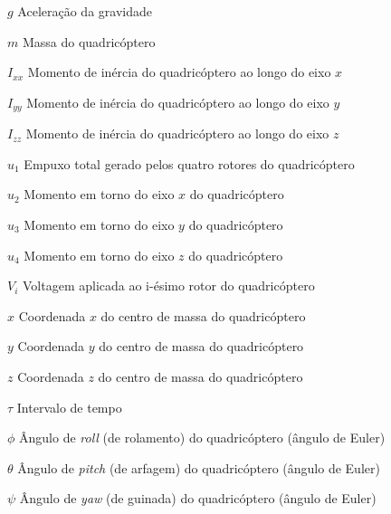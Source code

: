 %
%

\begin{simbolos}
	\item[$ g $] Aceleração da gravidade
	\item[$ m $] Massa do quadricóptero
	\item[$ I_{xx} $] Momento de inércia do quadricóptero ao longo do eixo $x$
	\item[$ I_{yy} $] Momento de inércia do quadricóptero ao longo do eixo $y$
	\item[$ I_{zz} $] Momento de inércia do quadricóptero ao longo do eixo $z$
	\item[$ u_1 $] Empuxo total gerado pelos quatro rotores do quadricóptero
	\item[$ u_2 $] Momento em torno do eixo $x$ do quadricóptero
	\item[$ u_3 $] Momento em torno do eixo $y$ do quadricóptero
	\item[$ u_4 $] Momento em torno do eixo $z$ do quadricóptero
	\item[$ V_i $] Voltagem aplicada ao i-ésimo rotor do quadricóptero
	\item[$ x $] Coordenada $x$ do centro de massa do quadricóptero
	\item[$ y $] Coordenada $y$ do centro de massa do quadricóptero
	\item[$ z $] Coordenada $z$ do centro de massa do quadricóptero
    \item[$ \tau $] Intervalo de tempo
    \item[$ \phi $] Ângulo de \textit{roll} (de rolamento) do quadricóptero (ângulo de Euler)
    \item[$ \theta $] Ângulo de \textit{pitch} (de arfagem) do quadricóptero (ângulo de Euler)
    \item[$ \psi $] Ângulo de \textit{yaw} (de guinada) do quadricóptero (ângulo de Euler)
    
    
\end{simbolos}

